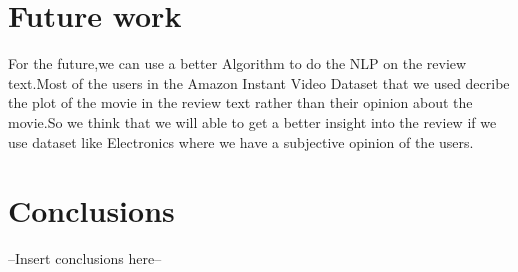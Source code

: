\documentclass{article} %
\begin{document}
\section{Future work}
For the future,we can use a better Algorithm to do the NLP on the review text.Most of the users in the Amazon Instant Video Dataset that
we used decribe the plot of the movie in the review text rather than their opinion about the movie.So we think that we will able to get
a better insight into the review if we use dataset like Electronics where we have a subjective opinion of the users.


\section{Conclusions}

--Insert conclusions here-- 



	
\end{document}
